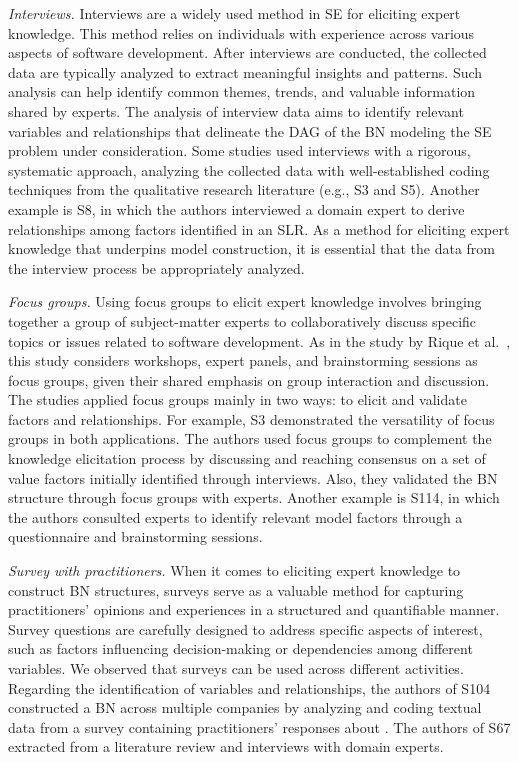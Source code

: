 \textit{Interviews.} Interviews are a widely used method in SE for eliciting expert knowledge. This method relies on individuals with experience across various aspects of software development. After interviews are conducted, the collected data are typically analyzed to extract meaningful insights and patterns. Such analysis can help identify common themes, trends, and valuable information shared by experts. The analysis of interview data aims to identify relevant variables and relationships that delineate the DAG of the BN modeling the SE problem under consideration. Some studies used interviews with a rigorous, systematic approach, analyzing the collected data with well-established coding techniques from the qualitative research literature (e.g., S3 and S5). Another example is S8, in which the authors interviewed a domain expert to derive relationships among factors identified in an SLR. As a method for eliciting expert knowledge that underpins model construction, it is essential that the data from the interview process be appropriately analyzed.

\textit{Focus groups.} Using focus groups to elicit expert knowledge involves bringing together a group of subject-matter experts to collaboratively discuss specific topics or issues related to software development. As in the study by Rique et al.~\cite{rique2025constructing}, this study considers workshops, expert panels, and brainstorming sessions as focus groups, given their shared emphasis on group interaction and discussion. The studies applied focus groups mainly in two ways: to elicit and validate factors and relationships. For example, S3 demonstrated the versatility of focus groups in both applications. The authors used focus groups to complement the knowledge elicitation process by discussing and reaching consensus on a set of value factors initially identified through interviews. Also, they validated the BN structure through focus groups with experts. Another example is S114, in which the authors consulted experts to identify relevant model factors through a questionnaire and brainstorming sessions.

\textit{Survey with practitioners.} When it comes to eliciting expert knowledge to construct BN structures, surveys serve as a valuable method for capturing practitioners' opinions and experiences in a structured and quantifiable manner. Survey questions are carefully designed to address specific aspects of interest, such as factors influencing decision-making or dependencies among different variables. We observed that surveys can be used across different activities. Regarding the identification of variables and relationships, the authors of S104 constructed a BN across multiple companies by analyzing and coding textual data from a survey containing practitioners' responses about . The authors of S67  extracted from a literature review and interviews with domain experts.

